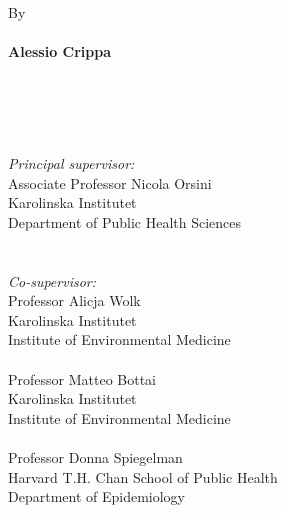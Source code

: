 \documentclass[11pt,a4paper,twoside,openany]{book}\usepackage{knitr}
\begin{document}
%
\null
\vspace{1.5cm}
\\
\\
\\
\\
\\
By
\\
\\
{\Large \textbf{\textsf{Alessio Crippa}}}
\\
\\
\\
\\
\\
\begin{minipage}[t]{6.25cm}
\singlespacing
{\small
\textit{Principal supervisor:}\\
Associate Professor Nicola Orsini \\
Karolinska Institutet \\
Department of Public Health Sciences \\
\\
\\
\textit{Co-supervisor:}\\
Professor Alicja Wolk \\
Karolinska Institutet \\
Institute of Environmental Medicine \\
\\
Professor Matteo Bottai \\
Karolinska Institutet \\
Institute of Environmental Medicine \\
\\
Professor Donna Spiegelman \\
Harvard T.H. Chan School of Public Health \\
Department of Epidemiology \\
}
\end{minipage}
\hspace{1.5cm}
\end{document}

